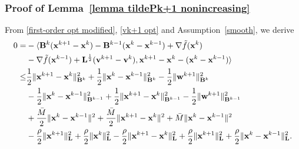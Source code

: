 \documentclass[10pt,a4paper]{amsart}
\begin{document}
\subsubsection{Proof of Lemma~\ref{lemma tildePk+1 nonincreasing}}\label{proof lemma tildePk+1 nonincreasing}
From \eqref{first-order opt modified}, \eqref{vk+1 opt} and Assumption~\ref{smooth}, we derive
\vspace{-0.2cm}
\begin{align}
	0=& -\langle \mathbf{B}^k (\mathbf{x}^{k+1}-\mathbf{x}^k)-\mathbf{B}^{k-1}(\mathbf{x}^{k}-\mathbf{x}^{k-1})+\nabla \tilde{f}(\mathbf{x}^k) \notag\\
    &-\nabla \tilde{f}(\mathbf{x}^{k-1}) + \mathbf{L}^{\frac{1}{2}}(\mathbf{v}^{k+1}-\mathbf{v}^k), \mathbf{x}^{k+1}-\mathbf{x}^k-(\mathbf{x}^{k}-\mathbf{x}^{k-1})\rangle\notag\\
	\leq & \frac{1}{2}\|\mathbf{x}^{k+1} - \mathbf{x}^{k}\|^2_{\mathbf{B}^k}+\frac{1}{2}\|\mathbf{x}^{k} - \mathbf{x}^{k-1}\|^2_{\mathbf{B}^k}-\frac{1}{2}\|\mathbf{w}^{k+1}\|^2_{\mathbf{B}^k}\notag\\
    & - \frac{1}{2}\|\mathbf{x}^{k} - \mathbf{x}^{k-1}\|^2_{\mathbf{B}^{k-1}}+\frac{1}{2}\|\mathbf{x}^{k+1} - \mathbf{x}^{k}\|^2_{\mathbf{B}^{k-1}}-\frac{1}{2}\|\mathbf{w}^{k+1}\|^2_{\mathbf{B}^{k-1}}\notag\\
	& + \frac{\bar{M}}{2}\|\mathbf{x}^{k} - \mathbf{x}^{k-1}\|^2+\frac{\bar{M}}{2}\|\mathbf{x}^{k+1} - \mathbf{x}^{k}\|^2+\bar{M}\|\mathbf{x}^{k} - \mathbf{x}^{k-1}\|^2\notag\\
	& -\frac{\rho}{2}\|\mathbf{x}^{k+1}\|^2_\mathbf{L} + \frac{\rho}{2}\|\mathbf{x}^k\|^2_\mathbf{L}- \frac{\rho}{2}\|\mathbf{x}^{k+1}- \mathbf{x}^{k}\|^2_\mathbf{L}+\frac{\rho}{2}\|\mathbf{x}^{k+1}\|^2_\mathbf{L} + \frac{\rho}{2}\|\mathbf{x}^{k}- \mathbf{x}^{k-1}\|^2_\mathbf{L}. \label{0=-<>}

\end{align}
\end{document}
